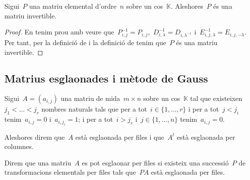 \documentclass[../../Main.tex]{subfiles}
\begin{document}
	\begin{proposition}
		\label{prop:les matrius elementals són invertibles}
		Sigui~\(P\) una matriu elemental d'ordre~\(n\) sobre un cos~\(\mathbb{K}\).
		Aleshores~\(P\) és una matriu invertible.
		\begin{proof}
			En tenim prou amb veure que~\(P_{i,j}^{-1}=P_{i,j}\),~\(D_{i,\lambda}^{-1}=D_{i,\lambda^{-1}}\) i~\(E_{i,j,\lambda}^{-1}=E_{i,j,-\lambda}\).
			Per tant, per la definició de  i la definició de  tenim que~\(P\) és una matriu invertible.
		\end{proof}
	\end{proposition}
	\subsection{Matrius esglaonades i mètode de Gauss}
	\begin{definition}
		\label{def:matriu esglaonada}
		Sigui~\(A=(a_{i,j})\) una matriu de mida~\(m\times n\) sobre un cos~\(\mathbb{K}\) tal que existeixen~\(j_{1}<\dots<j_{r}\) nombres naturals tals que per a tot~\(i\in\{1,\dots,r\}\) i per a tot~\(j<j_{i}\) tenim~\(a_{i,j}=0\) i~\(a_{i,j_{i}}=1\); i per a tot~\(i>j_{r}\) i~\(j\in\{1,\dots,n\}\) tenim~\(a_{i,j}=0\).

		Aleshores direm que~\(A\) està esglaonada per files i que~\(A^{t}\) està esglaonada per columnes.

		Direm que una matriu~\(A\) es pot esglaonar per files si existeix una successió~\(P\) de transformacions elementals per files tals que~\(PA\) està esglaonada per files.
	\end{definition}
\end{document}
